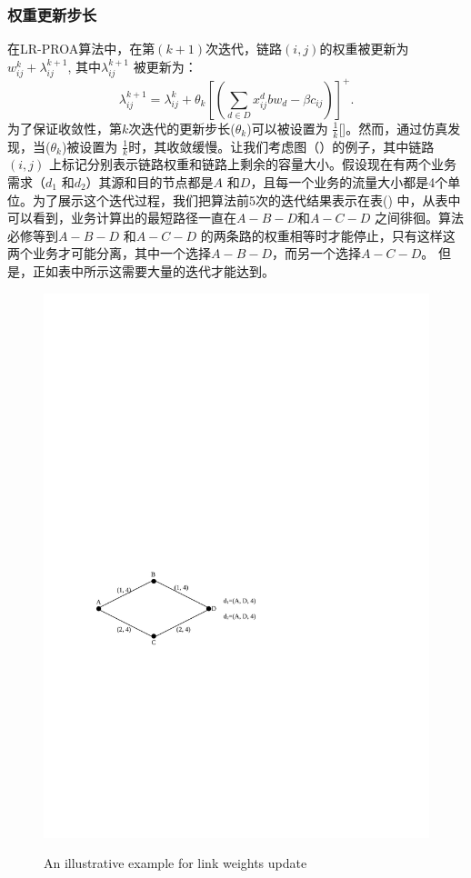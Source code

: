 \subsubsection{权重更新步长}
  在LR-PROA算法中，在第$(k+1)$次迭代，链路$(i,j)$的权重被更新为$w_{ij}^{k} + \lambda_{ij}^{k+1}$, 其中$\lambda_{ij}^{k+1}$ 被更新为：
\begin{equation}\label{Iter}
  \lambda_{ij}^{k+1} = \lambda_{ij}^k + \theta_k[(\sum\limits_{d \in D}x_{ij}^dbw_d - \beta c_{ij})]^+.
\end{equation}
  为了保证收敛性，第$k$次迭代的更新步长($\theta_k$)可以被设置为 $\frac{1}{k}$[]。然而，通过仿真发现，当($\theta_k$)被设置为 $\frac{1}{k}$时，其收敛缓慢。让我们考虑图（）的例子，其中链路$(i,j)$ 上标记分别表示链路权重和链路上剩余的容量大小。假设现在有两个业务需求（$d_1$ 和$d_2$）其源和目的节点都是$A$ 和$D$，且每一个业务的流量大小都是4个单位。为了展示这个迭代过程，我们把算法前5次的迭代结果表示在表() 中，从表中可以看到，业务计算出的最短路径一直在$A-B-D$和$A-C-D$ 之间徘徊。算法必修等到$A-B-D$ 和$A-C-D$ 的两条路的权重相等时才能停止，只有这样这两个业务才可能分离，其中一个选择$A-B-D$，而另一个选择$A-C-D$。 但是，正如表中所示这需要大量的迭代才能达到。
\begin{figure}
\setlength{\belowcaptionskip}{-0.1cm}
  \begin{center}
    {\includegraphics[width=0.4 \textwidth]{figures/IterNum.pdf}}
    \end{center}
  \caption{{\footnotesize{An illustrative example for link weights update}}}
  \label{IterNum}
\end{figure}
